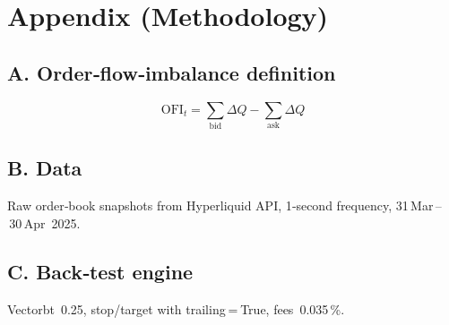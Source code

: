 \documentclass[a4paper,12pt]{article}
\begin{document}
\section*{Appendix (Methodology)}

\subsection*{A. Order‑flow‑imbalance definition}
\[
\text{OFI}_t=\sum_{\text{bid}} \Delta Q - \sum_{\text{ask}} \Delta Q
\]

\subsection*{B. Data}
Raw order‑book snapshots from Hyperliquid API,
1‑second frequency,
31 Mar – 30 Apr 2025.

\subsection*{C. Back‑test engine}
Vectorbt 0.25, stop/target with trailing = True, fees 0.035 \%.
\end{document}
